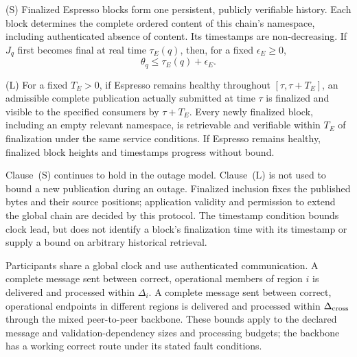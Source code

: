 \begin{assumption}
\label{ass:espresso}
\textup{(S)} Finalized Espresso blocks form one persistent, publicly
verifiable history.  Each block determines the complete ordered content
of this chain's namespace, including authenticated absence of content.
Its timestamps are non-decreasing.  If $J_q$ first becomes final at real
time $\tau_E(q)$, then, for a fixed $\epsilon_E\ge0$,
\begin{equation}
\label{eq:espresso-clock-lead}
 \theta_q\le\tau_E(q)+\epsilon_E.
\end{equation}

\textup{(L)} For a fixed $T_E>0$, if Espresso remains healthy throughout
$[\tau,\tau+T_E]$, an admissible complete publication actually submitted
at time $\tau$ is finalized and visible to the specified consumers by
$\tau+T_E$.  Every newly
finalized block, including an empty relevant namespace, is retrievable
and verifiable within $T_E$ of finalization under the same service
conditions.  If Espresso remains healthy, finalized block heights and
timestamps progress without bound.
\end{assumption}

Clause~(S) continues to hold in the outage model.  Clause~(L) is not used
to bound a new publication during an outage.  Finalized inclusion fixes
the published bytes and their source positions; application validity
and permission to extend the global chain are decided by this
protocol.  The timestamp condition bounds clock lead, but does not
identify a block's finalization time with its timestamp or supply a
bound on arbitrary historical retrieval.

\begin{assumption}
\label{ass:communication}
Participants share a global clock and use authenticated communication.
A complete message sent between correct, operational members of region
$i$ is delivered and processed within $\Delta_i$.  A complete message
sent between correct, operational endpoints in different regions is
delivered and processed within $\Delta_{\rm cross}$ through the mixed
peer-to-peer backbone.  These bounds apply to the declared message and
validation-dependency sizes and processing budgets; the backbone has a
working correct route under its stated fault conditions.
\end{assumption}

